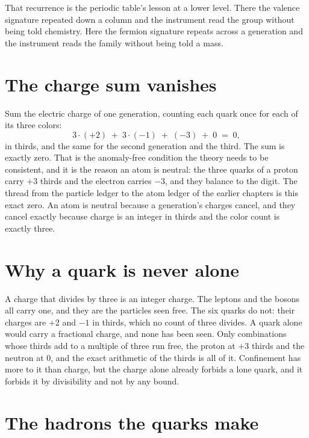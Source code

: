 That recurrence is the periodic table's lesson at a lower level. There the valence signature repeated
down a column and the instrument read the group without being told chemistry. Here the fermion
signature repeats across a generation and the instrument reads the family without being told a mass.

\section{The charge sum vanishes}

Sum the electric charge of one generation, counting each quark once for each of its three colors:
\[
3 \cdot (+2) \;+\; 3 \cdot (-1) \;+\; (-3) \;+\; 0 \;=\; 0,
\]
in thirds, and the same for the second generation and the third. The sum is exactly zero. That is the
anomaly-free condition the theory needs to be consistent, and it is the reason an atom is neutral: the
three quarks of a proton carry $+3$ thirds and the electron carries $-3$, and they balance to the digit.
The thread from the particle ledger to the atom ledger of the earlier chapters is this exact zero. An
atom is neutral because a generation's charges cancel, and they cancel exactly because charge is an
integer in thirds and the color count is exactly three.

\section{Why a quark is never alone}

A charge that divides by three is an integer charge. The leptons and the bosons all carry one, and they
are the particles seen free. The six quarks do not: their charges are $+2$ and $-1$ in thirds, which no
count of three divides. A quark alone would carry a fractional charge, and none has been seen. Only
combinations whose thirds add to a multiple of three run free, the proton at $+3$ thirds and the
neutron at $0$, and the exact arithmetic of the thirds is all of it. Confinement has more to it than
charge, but the charge alone already forbids a lone quark, and it forbids it by divisibility and not by
any bound.

\section{The hadrons the quarks make}

